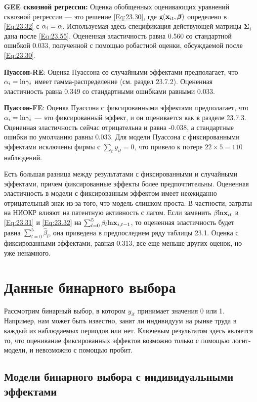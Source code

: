 \textbf{GEE сквозной регрессии:} Оценка обобщенных оценивающих уравнений сквозной регрессии --- это решение \ref{Eq:23.30}, где $\mathrm g(\mathbf{x}_{it}, \bm{\beta})$ определено в \ref{Eq:23.32} с $\alpha_i=\alpha$. Используемая здесь спецификация действующей матрицы $\bm\Sigma_i$ дана после \ref{Eq:23.55}. Оцененная эластичность равна 0.560 со стандартной ошибкой 0.033, полученной с помощью робастной оценки, обсуждаемой после \ref{Eq:23.30}.

\textbf{Пуассон-RE}: Оценка Пуассона со случайными эффектами предполагает, что $\alpha_i=\mathrm{ln} \gamma_i$ имеет гамма-распределение (см. раздел 23.7.2). Оцененная эластичность равна 0.349 со стандартными ошибками равными 0.033.

\textbf{Пуассон-FE}: Оценка Пуассона с фиксированными эффектами предполагает, что $\alpha_i=\mathrm{ln} \gamma_i$ --- это фиксированный эффект, и он оценивается как в разделе 23.7.3. Оцененная эластичность сейчас отрицательна и равна -0.038, а стандартные ошибки по умолчанию равны 0.033. Для модели Пуассона с фиксированными эффектами исключены фирмы с $\sum_t y_{it}=0$, что привело к потере $22 \times 5=110$ наблюдений.

Есть большая разница между результатами с фиксированными и случайными эффектами, причем фиксированные эффекты более предпочтительны. Оцененная эластичность в модели с фиксированным эффектом имеет неожиданно отрицательный знак из-за того, что модель слишком проста. В частности, затраты на НИОКР влияют на патентную активность с лагом. Если заменить $\beta \mathrm{ln} \mathbf{x}_{it}$ в \ref{Eq:23.31} и \ref{Eq:23.32} на $\sum^5_{l=0} \beta_l \mathrm{ln} \mathbf{x}_{i,t-1}$, то оцененная эластичность будет равна $\sum^5_{l=0} \hat{\beta}_l$, она приведена в предпоследнем ряду таблицы 23.1. Оценка с фиксированными эффектами, равная 0.313, все еще меньше других оценок, но уже ненамного.

\section{Данные бинарного выбора}

Рассмотрим бинарный выбор, в котором $y_{it}$ принимает значения 0 или 1. Например, нам может быть известно, занят ли индивидуум на рынке труда в каждый из наблюдаемых периодов или нет. Ключевым результатом здесь является то, что оценивание фиксированных эффектов возможно только с помощью логит-модели, и невозможно с помощью пробит.

\subsection{Модели бинарного выбора с индивидуальными эффектами}

